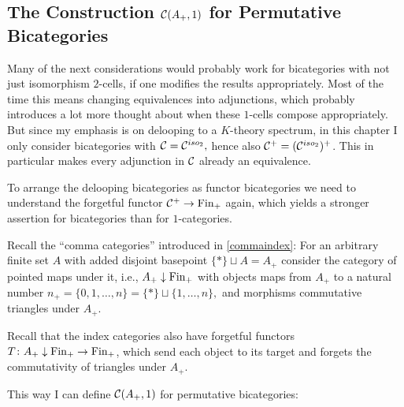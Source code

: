 {\subsection*{The Construction $\mathcal{C}(A_+,1)$ for Permutative Bicategories}
Many of the next considerations would probably work for bicategories 
with not just isomorphism $2$-cells, if one modifies the results 
appropriately. Most of the time this means changing equivalences into
adjunctions, which probably introduces a lot more thought about when
these $1$-cells compose appropriately. But since my emphasis is on 
delooping to a $K$-theory spectrum, in this chapter I only consider 
bicategories with $\mathcal{C} = \mathcal{C}^{iso_2},$ hence also $\mathcal{C}^+=(\mathcal{C}^{iso_2})^+$. 
This in particular makes every adjunction in $\mathcal{C}$ already an 
equivalence.

To arrange the delooping bicategories as functor bicategories
we need to understand the forgetful functor $\mathcal{C}^+\rightarrow \mathrm{Fin}_+$ 
again, which yields a stronger assertion for bicategories than
for $1$-categories.
{}

Recall the ``comma categories'' introduced in \ref{commaindex}: For
an arbitrary finite set $A$ with added disjoint basepoint $\{*\}\sqcup A=A_+$
consider the category of pointed maps under it, i.e., $A_+\downarrow\mathrm{Fin}_+$ 
with objects maps from $A_+$ to a natural number $n_+=\{0,1,
\ldots,n \}=\{*\}\sqcup\{1,\ldots,n\},$ and morphisms commutative 
triangles under $A_+$. 

Recall that the index categories also have forgetful functors 
$T\colon A_+\downarrow\mathrm{Fin}_+ \rightarrow \mathrm{Fin}_+$, which send each object to its 
target and forgets the commutativity of triangles under $A_+$. 

This way I can define $\mathcal{C}(A_+,1)$ for permutative bicategories:
{}}
